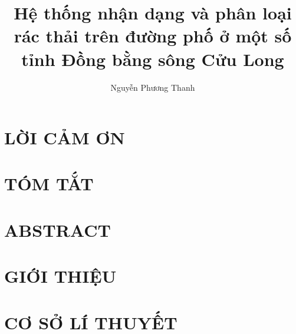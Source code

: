 \documentclass[a4paper,12pt,oneside]{report}
\title{Hệ thống nhận dạng và phân loại rác thải trên đường phố ở một số tỉnh Đồng bằng sông Cửu Long}						%
\author{Nguyễn Phương Thanh}				%
\begin{document}


% 

\chapter*{\centering LỜI CẢM ƠN}


% 

\chapter*{\centering TÓM TẮT}


\chapter*{\centering ABSTRACT}


% 

\tableofcontents
\listoffigures
\listoftables



\glsaddall[types=\acronymtype]

\printglossary[title=DANH MỤC TỪ VIẾT TẮT]




\clearpage
{}			%

\chapter{ GIỚI THIỆU}

\chapter{ CƠ SỞ LÍ THUYẾT}

\end{document}
